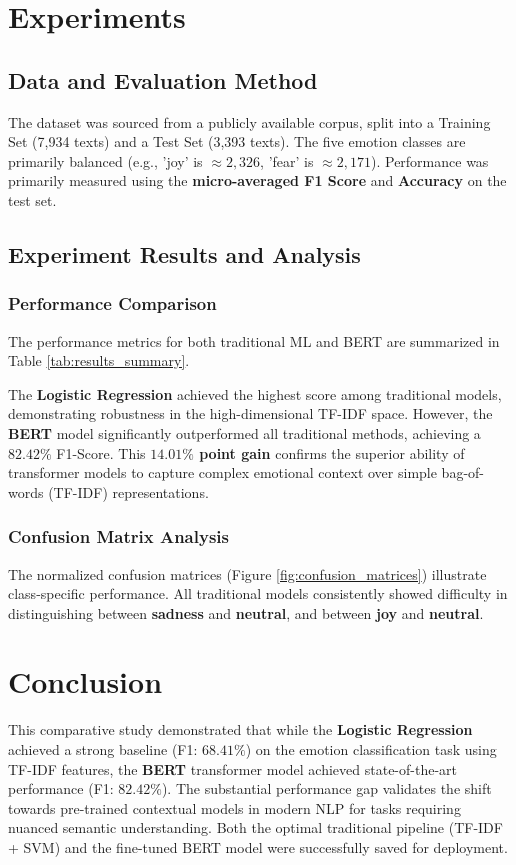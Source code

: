 \documentclass{article}
\begin{document}
\section{Experiments}
\subsection{Data and Evaluation Method}
The dataset was sourced from a publicly available corpus, split into a Training Set (7,934 texts) and a Test Set (3,393 texts). The five emotion classes are primarily balanced (e.g., 'joy' is $\approx 2,326$, 'fear' is $\approx 2,171$). Performance was primarily measured using the \textbf{micro-averaged F1 Score} and \textbf{Accuracy} on the test set.

\subsection{Experiment Results and Analysis}

\subsubsection{Performance Comparison}
The performance metrics for both traditional ML and BERT are summarized in Table \ref{tab:results_summary}.


The \textbf{Logistic Regression} achieved the highest score among traditional models, demonstrating robustness in the high-dimensional TF-IDF space. However, the \textbf{BERT} model significantly outperformed all traditional methods, achieving a $82.42\%$ F1-Score. This \textbf{$14.01\%$ point gain} confirms the superior ability of transformer models to capture complex emotional context over simple bag-of-words (TF-IDF) representations.

\subsubsection{Confusion Matrix Analysis}
The normalized confusion matrices (Figure \ref{fig:confusion_matrices}) illustrate class-specific performance. All traditional models consistently showed difficulty in distinguishing between \textbf{sadness} and \textbf{neutral}, and between \textbf{joy} and \textbf{neutral}.


\section{Conclusion}

This comparative study demonstrated that while the \textbf{Logistic Regression} achieved a strong baseline (F1: $68.41\%$) on the emotion classification task using TF-IDF features, the \textbf{BERT} transformer model achieved state-of-the-art performance (F1: $82.42\%$). The substantial performance gap validates the shift towards pre-trained contextual models in modern NLP for tasks requiring nuanced semantic understanding. Both the optimal traditional pipeline (TF-IDF + SVM) and the fine-tuned BERT model were successfully saved for deployment.
\end{document}
